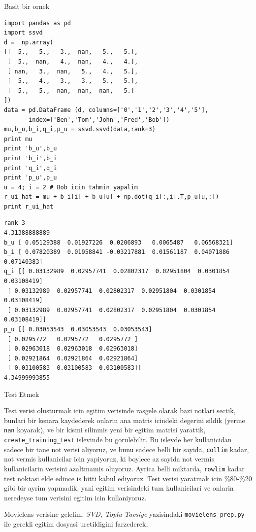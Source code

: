 \documentclass[12pt,fleqn]{article}\usepackage{../common}
\begin{document}
Basit bir ornek

\begin{verbatim}
import pandas as pd
import ssvd
d =  np.array(
[[  5.,   5.,   3.,  nan,   5.,   5.],
 [  5.,  nan,   4.,  nan,   4.,   4.],
 [ nan,   3.,  nan,   5.,   4.,   5.],
 [  5.,   4.,   3.,   3.,   5.,   5.],
 [  5.,   5.,  nan,  nan,  nan,   5.]
])
data = pd.DataFrame (d, columns=['0','1','2','3','4','5'],
       index=['Ben','Tom','John','Fred','Bob'])
mu,b_u,b_i,q_i,p_u = ssvd.ssvd(data,rank=3)
print mu
print 'b_u',b_u
print 'b_i',b_i
print 'q_i',q_i
print 'p_u',p_u
u = 4; i = 2 # Bob icin tahmin yapalim
r_ui_hat = mu + b_i[i] + b_u[u] + np.dot(q_i[:,i].T,p_u[u,:])
print r_ui_hat
\end{verbatim}

\begin{verbatim}
rank 3
4.31388888889
b_u [ 0.05129388  0.01927226  0.0206893   0.0065487   0.06568321]
b_i [ 0.07820389  0.01958841 -0.03217881  0.01561187  0.04071886  0.07140383]
q_i [[ 0.03132989  0.02957741  0.02802317  0.02951804  0.0301854   0.03108419]
 [ 0.03132989  0.02957741  0.02802317  0.02951804  0.0301854   0.03108419]
 [ 0.03132989  0.02957741  0.02802317  0.02951804  0.0301854   0.03108419]]
p_u [[ 0.03053543  0.03053543  0.03053543]
 [ 0.0295772   0.0295772   0.0295772 ]
 [ 0.02963018  0.02963018  0.02963018]
 [ 0.02921864  0.02921864  0.02921864]
 [ 0.03100583  0.03100583  0.03100583]]
4.34999993855
\end{verbatim}

Test Etmek

Test verisi olusturmak icin egitim verisinde rasgele olarak bazi notlari
sectik, bunlari bir kenara kaydederek onlarin ana matris icindeki degerini
sildik (yerine \verb!nan!  koyarak), ve bir kismi silinmis yeni bir egitim
matrisi yarattik, \verb!create_training_test! islevinde bu gorulebilir. Bu
islevde her kullanicidan sadece bir tane not verisi aliyoruz, ve bunu
sadece belli bir sayida, \verb!collim! kadar, not vermis kullanicilar icin
yapiyoruz, ki boylece az sayida not vermis kullanicilarin verisini azaltmamis
oluyoruz. Ayrica belli miktarda, \verb!rowlim! kadar test noktasi elde
edince is bitti kabul ediyoruz. Test verisi yaratmak icin \%80-\%20 gibi
bir ayrim yapmadik, yani egitim verisindeki tum kullanicilari ve onlarin
neredeyse tum verisini egitim icin kullaniyoruz.

Movielens verisine gelelim. {\em SVD, Toplu Tavsiye} yazisindaki
\verb!movielens_prep.py! ile gerekli egitim dosyasi uretildigini
farzederek,
\end{document}
